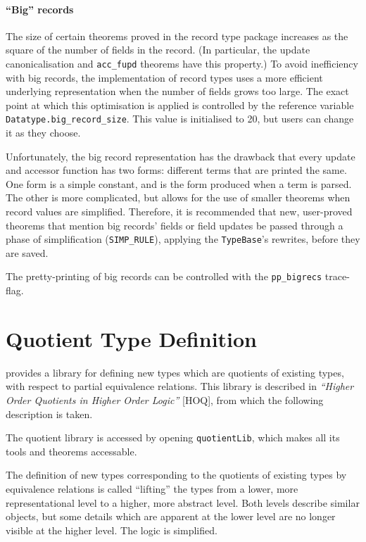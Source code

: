 \paragraph{``Big'' records} The size of certain theorems proved in the
record type package increases as the square of the number of fields in
the record.  (In particular, the update canonicalisation and
\texttt{acc\_fupd} theorems have this property.) To avoid inefficiency
with big records, the implementation of record types uses a more
efficient underlying representation when the number of fields grows
too large.  The exact point at which this optimisation is applied is
controlled by the reference variable
\texttt{Datatype.big\_record\_size}.  This value is initialised to 20,
but users can change it as they choose.

Unfortunately, the big record representation has the drawback that
every update and accessor function has two forms: different terms that
are printed the same.  One form is a simple constant, and is the form
produced when a term is parsed.  The other is more complicated, but
allows for the use of smaller theorems when record values are
simplified.  Therefore, it is recommended that new, user-proved
theorems that mention big records' fields or field updates be passed
through a phase of simplification (\texttt{SIMP\_RULE}), applying the
\texttt{TypeBase}'s rewrites, before they are saved.

The pretty-printing of big records can be controlled with the
\texttt{pp\_bigrecs} trace-flag.


\section{Quotient Type Definition}\label{quotients}

\HOL{} provides a library for defining new types which are quotients
of existing types, with respect to partial equivalence relations.
This library is described in {\it ``Higher Order Quotients in Higher
Order Logic''} [HOQ], from which the following description is taken.

The quotient library is accessed by opening {\tt quotientLib},
which makes all its tools and theorems accessable.

The definition of new types corresponding to the quotients of
existing types by equivalence relations is called ``lifting''
the types from a lower, more representational level to a higher,
more abstract level.  Both levels describe similar objects, but
some details which are apparent at the lower level are no longer
visible at the higher level.  The logic is simplified.

